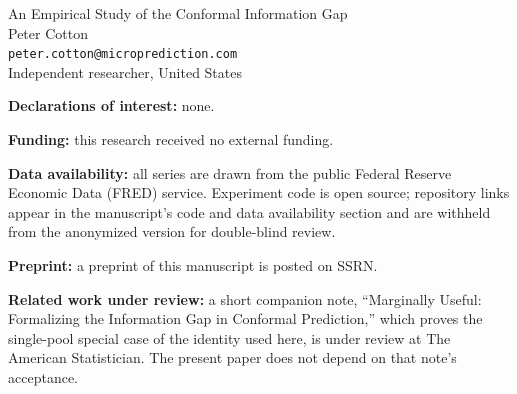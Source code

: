 \documentclass[11pt]{article}
\begin{document}
\begin{center}
{\LARGE An Empirical Study of the Conformal Information Gap}\\[18pt]
{\large Peter Cotton}\\[4pt]
\texttt{peter.cotton@microprediction.com}\\[4pt]
Independent researcher, United States
\end{center}

\vspace{24pt}
\noindent\textbf{Declarations of interest:} none.

\vspace{6pt}
\noindent\textbf{Funding:} this research received no external funding.

\vspace{6pt}
\noindent\textbf{Data availability:} all series are drawn from the public Federal
Reserve Economic Data (FRED) service. Experiment code is open source; repository
links appear in the manuscript's code and data availability section and are
withheld from the anonymized version for double-blind review.

\vspace{6pt}
\noindent\textbf{Preprint:} a preprint of this manuscript is posted on SSRN.

\vspace{6pt}
\noindent\textbf{Related work under review:} a short companion note, ``Marginally
Useful: Formalizing the Information Gap in Conformal Prediction,'' which proves the
single-pool special case of the identity used here, is under review at The American
Statistician. The present paper does not depend on that note's acceptance.
\end{document}
